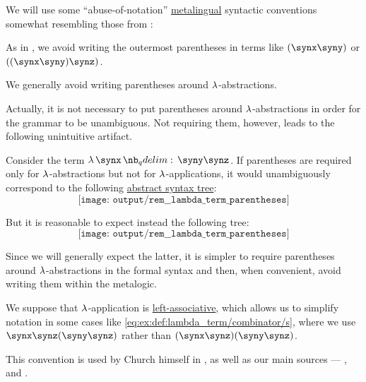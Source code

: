 \begin{remark}\label{rem:lambda_term_parentheses}
  We will use some \enquote{abuse-of-notation} \hyperref[con:metalogic]{metalingual} syntactic conventions somewhat resembling those from :
  \begin{thmenum}
     As in , we avoid writing the outermost parentheses in terms like \( (\synx \syny) \) or \( ((\synx \syny) \synz) \).

     We generally avoid writing parentheses around \( \mathrm{\lambda} \)-abstractions.

    Actually, it is not necessary to put parentheses around \( \mathrm{\lambda} \)-abstractions in order for the grammar to be unambiguous. Not requiring them, however, leads to the following unintuitive artifact.

    Consider the term \( \qabs \synx \syny \synz \). If parentheses are required only for \( \mathrm{\lambda} \)-abstractions but not for \( \mathrm{\lambda} \)-applications, it would unambiguously correspond to the following \hyperref[def:lambda_term_ast]{abstract syntax tree}:
    \begin{equation*}
      \texttt{[image: output/rem\_\_lambda\_term\_parentheses]}
    \end{equation*}

    But it is reasonable to expect instead the following tree:
    \begin{equation*}
      \texttt{[image: output/rem\_\_lambda\_term\_parentheses]}
    \end{equation*}

    Since we will generally expect the latter, it is simpler to require parentheses around \( \mathrm{\lambda} \)-abstractions in the formal syntax and then, when convenient, avoid writing them within the metalogic.

     We suppose that \( \mathrm{\lambda} \)-application is \hyperref[rem:binary_operation_syntax_trees/associativity]{left-associative}, which allows us to simplify notation in some cases like \eqref{eq:ex:def:lambda_term/combinator/s}, where we use \( \synx \synz (\syny \synz) \) rather than \( (\synx \synz)(\syny \synz) \).

    This convention is used by Church himself in , as well as our main sources --- ,  and .
  \end{thmenum}
\end{remark}

